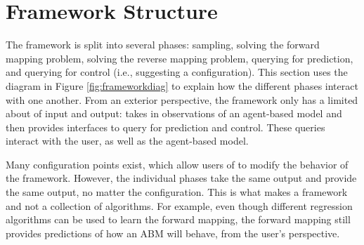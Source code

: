 \section{Framework Structure}

The framework is split into several phases: sampling, solving the forward mapping problem, solving the reverse mapping problem, querying for prediction, and querying for control (i.e., suggesting a configuration).
This section uses the diagram in Figure \ref{fig:frameworkdiag} to explain how the different phases interact with one another.
From an exterior perspective, the framework only has a limited about of input and output:
\fw takes in observations of an agent-based model and then provides interfaces to query for prediction and control.
These queries interact with the user, as well as the agent-based model.

Many configuration points exist, which allow users of \fw to modify the behavior of the framework.
However, the individual phases take the same output and provide the same output, no matter the configuration.
This is what makes \fw a framework and not a collection of algorithms.
For example, even though different regression algorithms can be used to learn the forward mapping, the forward mapping still provides predictions of how an ABM will behave, from the user's perspective.







